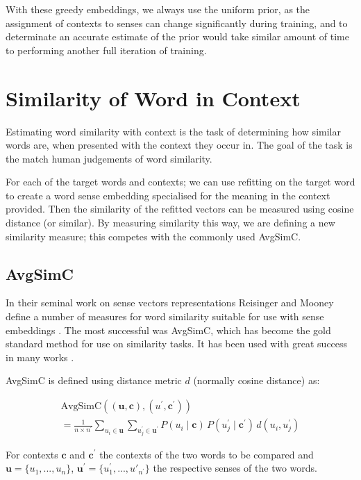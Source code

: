 \documentclass{sig-alternate}
\renewcommand{\c}{\mathbf{c}}
\renewcommand{\u}{\mathbf{u}}
\begin{document}
With these greedy embeddings, we always use the uniform prior, as the assignment of contexts  to senses can change significantly during training, and to determinate an accurate estimate of the prior would take similar amount of time to performing another full iteration of training.



\section{Similarity of Word in Context} \label{SimilarityInContext}
Estimating word similarity with context is the task of determining how similar words are, when presented with the context they occur in. The goal of the task is the match human judgements of word similarity.

For each of the target words and contexts; we can use refitting on the target word to create a word sense embedding specialised for the meaning in the context provided. Then the similarity of the refitted vectors can be measured using cosine distance (or similar).
By measuring similarity this way, we are defining a new similarity measure; this competes with the commonly used AvgSimC.

\subsection{AvgSimC}
In their seminal work on sense vectors representations Reisinger and Mooney define a number of measures for word similarity suitable for use with sense embeddings \parencite{Reisinger2010}. The most successful was AvgSimC, which has become the gold standard method for use on similarity tasks. It has been used with great success in many works \cite{Huang2012, Chen2014, tian2014probabilistic}. 


AvgSimC is defined using distance metric $d$ (normally cosine distance) as: 

\begin{multline} \label{eq:avgsimc}
\mathrm{AvgSimC}((\u,\c),(u^{\prime},\c^{\prime})) \\
=  \frac{1}{n \times n^{\prime}}
\sum_{u_{i}\in\u}
\sum_{u_{j}^{\prime}\in\u^{\prime}}
P(u_{i}\mid\c)\,P(u_{j}^{\prime}\mid\c^{\prime})\,d(u_{i},u_{j}^{\prime})
\end{multline}

For contexts $\c$ and $\c^\prime$ the contexts of the two words to be compared and  $\u=\{u_1,...,u_n\}$, $\u^\prime=\{u^\prime_1,...,u\prime_{n^\prime}\}$ the respective senses of the two words.
\end{document}
